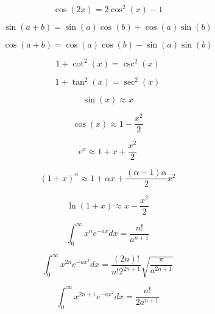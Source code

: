 \documentclass[12pt]{book}
\begin{document}
\begin{multicols}{2}
\begin{equation*}
 \cos(2x) = 2\cos^2(x)-1
\end{equation*}

\begin{equation*}
 \sin(a+b) = \sin(a)\cos(b)+\cos(a)\sin(b)
\end{equation*}

\begin{equation*}
 \cos(a+b) = \cos(a)\cos(b)-\sin(a)\sin(b)
\end{equation*}

\begin{equation*}
 1+\cot^2(x) = \csc^2(x)
\end{equation*}

\begin{equation*}
 1+\tan^2(x) = \sec^2(x)
\end{equation*}

\begin{equation*}
 \sin(x) \approx x
\end{equation*}

\begin{equation*}
 \cos(x) \approx 1-\frac{x^2}{2}
\end{equation*}

\begin{equation*}
 e^x \approx 1+x+\frac{x^2}{2}
\end{equation*}

\begin{equation*}
 (1+x)^\alpha \approx 1+\alpha x+\frac{(\alpha-1)\alpha}{2} x^2
\end{equation*}

\begin{equation*}
 \ln(1+x) \approx x-\frac{x^2}{2}
\end{equation*}

\columnbreak

\begin{equation*}
 \int_0^\infty x^{n} e^{-ax} dx = \frac{n!}{a^{n+1}}
\end{equation*}

\begin{equation*}
 \int_0^\infty x^{2n} e^{-ax^2} dx = \frac{(2n)!}{n!2^{2n+1}} \sqrt{\frac{\pi}{a^{2n+1}}}
\end{equation*}

\begin{equation*}
 \int_0^\infty x^{2n+1} e^{-ax^2} dx = \frac{n!}{2 a^{n+1}}
\end{equation*}


\end{multicols}
\end{document}
